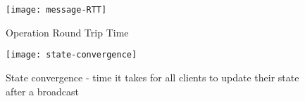 \begin{figure}
    \centering
    \texttt{[image: message-RTT]}
    \caption{Operation Round Trip Time}
    \label{fig:message-RTT}
\end{figure}


\begin{figure}
    \centering
    \texttt{[image: state-convergence]}
    \caption{State convergence - time it takes for all clients to update their state after a broadcast}
    \label{fig:state-convergence}
\end{figure}